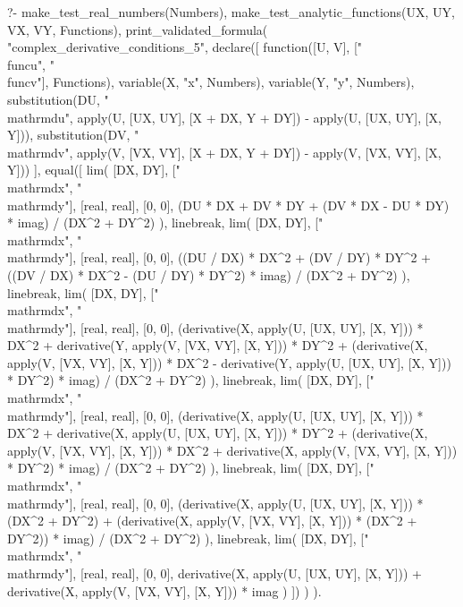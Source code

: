 \begin{prolog}
?-	make_test_real_numbers(Numbers),
	make_test_analytic_functions(UX, UY, VX, VY, Functions),
	print_validated_formula(
		"complex_derivative_conditions_5",
		declare([
			function([U, V], ["\\func{u}", "\\func{v}"], Functions), 
			variable(X, "x", Numbers),
			variable(Y, "y", Numbers),
			substitution(DU, "\\mathrm{d}u", apply(U, [UX, UY], [X + DX, Y + DY]) - apply(U, [UX, UY], [X, Y])),
			substitution(DV, "\\mathrm{d}v", apply(V, [VX, VY], [X + DX, Y + DY]) - apply(V, [VX, VY], [X, Y]))
		],
			equal([
				lim(
					[DX, DY], ["\\mathrm{d}x", "\\mathrm{d}y"], [real, real], [0, 0],
					(DU * DX + DV * DY + (DV * DX - DU * DY) * imag) / (DX^2 + DY^2)
				),
				linebreak,
				lim(
					[DX, DY], ["\\mathrm{d}x", "\\mathrm{d}y"], [real, real], [0, 0],
					((DU / DX) * DX^2 + (DV / DY) * DY^2 + ((DV / DX) * DX^2 - (DU / DY) * DY^2) * imag) / (DX^2 + DY^2)
				),
				linebreak,
				lim(
					[DX, DY], ["\\mathrm{d}x", "\\mathrm{d}y"], [real, real], [0, 0],
					(derivative(X, apply(U, [UX, UY], [X, Y])) * DX^2 + derivative(Y, apply(V, [VX, VY], [X, Y])) * DY^2 + (derivative(X, apply(V, [VX, VY], [X, Y])) * DX^2 - derivative(Y, apply(U, [UX, UY], [X, Y])) * DY^2) * imag) / (DX^2 + DY^2)
				),
				linebreak,
				lim(
					[DX, DY], ["\\mathrm{d}x", "\\mathrm{d}y"], [real, real], [0, 0],
					(derivative(X, apply(U, [UX, UY], [X, Y])) * DX^2 + derivative(X, apply(U, [UX, UY], [X, Y])) * DY^2 + (derivative(X, apply(V, [VX, VY], [X, Y])) * DX^2 + derivative(X, apply(V, [VX, VY], [X, Y])) * DY^2) * imag) / (DX^2 + DY^2)
				),
				linebreak,
				lim(
					[DX, DY], ["\\mathrm{d}x", "\\mathrm{d}y"], [real, real], [0, 0],
					(derivative(X, apply(U, [UX, UY], [X, Y])) * (DX^2 + DY^2) + (derivative(X, apply(V, [VX, VY], [X, Y])) * (DX^2 + DY^2)) * imag) / (DX^2 + DY^2)
				),
				linebreak,
				lim(
					[DX, DY], ["\\mathrm{d}x", "\\mathrm{d}y"], [real, real], [0, 0],
					derivative(X, apply(U, [UX, UY], [X, Y])) + derivative(X, apply(V, [VX, VY], [X, Y])) * imag
				)
			])
		)
	).
\end{prolog}

